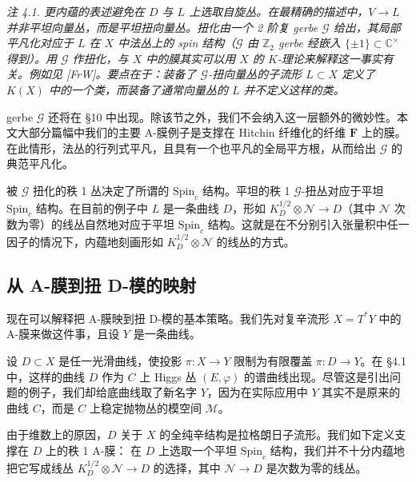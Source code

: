 \documentclass[11pt,a4paper]{article}
\begin{document}
\par\medskip\noindent\textit{注 4.1. 更内蕴的表述避免在 $D$ 与 $L$ 上选取自旋丛。在最精确的描述中，$V\to L$ 并非平坦向量丛，而是平坦扭向量丛。扭化由一个 2 阶复 gerbe $\mathcal{G}$ 给出，其局部平凡化对应于 $L$ 在 $X$ 中法丛上的 spin 结构（$\mathcal{G}$ 由 $\mathbb{Z}_2$ gerbe 经嵌入 $\{\pm1\}\subset\mathbb{C}^\times$ 得到）。用 $\mathcal{G}$ 作扭化，与 $X$ 中的膜其实可以用 $X$ 的 $K$-理论来解释这一事实有关。例如见 [FrW]。要点在于：装备了 $\mathcal{G}$-扭向量丛的子流形 $L\subset X$ 定义了 $K(X)$ 中的一个类，而装备了通常向量丛的 $L$ 并不定义这样的类。}

gerbe $\mathcal{G}$ 还将在 §10 中出现。除该节之外，我们不会纳入这一层额外的微妙性。本文大部分篇幅中我们的主要 A-膜例子是支撑在 Hitchin 纤维化的纤维 $\boldsymbol{F}$ 上的膜。在此情形，法丛的行列式平凡，且具有一个也平凡的全局平方根，从而给出 $\mathcal{G}$ 的典范平凡化。


被 $\mathcal{G}$ 扭化的秩 1 丛决定了所谓的 $\mathrm{Spin}_c$ 结构。平坦的秩 1 $\mathcal{G}$-扭丛对应于平坦 $\mathrm{Spin}_c$ 结构。在目前的例子中 $L$ 是一条曲线 $D$，形如 $K_D^{1/2}\otimes\mathcal{N}\to D$（其中 $\mathcal{N}$ 次数为零）的线丛自然地对应于平坦 $\mathrm{Spin}_c$ 结构。这就是在不分别引入张量积中任一因子的情况下，内蕴地刻画形如 $K_D^{1/2}\otimes\mathcal{N}$ 的线丛的方式。

\subsection{从 A-膜到扭 D-模的映射}

现在可以解释把 A-膜映到扭 D-模的基本策略。我们先对复辛流形 $X=T^*Y$ 中的 A-膜来做这件事，且设 $Y$ 是一条曲线。

设 $D\subset X$ 是任一光滑曲线，使投影 $\pi:X\to Y$ 限制为有限覆盖 $\pi:D\to Y$。在 §4.1 中，这样的曲线 $D$ 作为 $C$ 上 Higgs 丛 $(E,\varphi)$ 的谱曲线出现。尽管这是引出问题的例子，我们却给底曲线取了新名字 $Y$，因为在实际应用中 $Y$ 其实不是原来的曲线 $C$，而是 $C$ 上稳定抛物丛的模空间 $\mathcal{M}$。

由于维数上的原因，$D$ 关于 $X$ 的全纯辛结构是拉格朗日子流形。我们如下定义支撑在 $D$ 上的秩 1 A-膜：
在 $D$ 上选取一个平坦 $\mathrm{Spin}_c$ 结构，我们并不十分内蕴地把它写成线丛 $K_D^{1/2}\otimes\mathcal{N}\to D$ 的选择，其中 $\mathcal{N}\to D$ 是次数为零的线丛。
\end{document}
